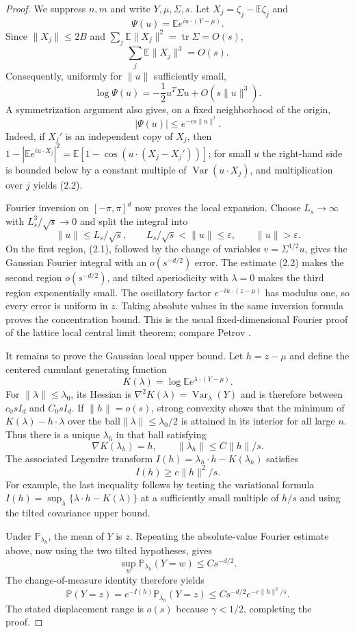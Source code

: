 \documentclass[11pt]{article}
\theoremstyle{remark}
\newcommand{\Pp}{\mathbb P}
\newcommand{\Ee}{\mathbb E}
\newcommand{\Var}{\operatorname{Var}}
\begin{document}
\begin{proof}
We suppress $n,m$ and write $Y,\mu,\Sigma,s$.  Let
$X_j=\zeta_j-\Ee\zeta_j$ and
\[
        \Psi(u)=\Ee e^{iu\cdot(Y-\mu)}.
\]
Since $\|X_j\|\le2B$ and
$\sum_j\Ee\|X_j\|^2=\operatorname{tr}\Sigma=O(s)$,
\[
        \sum_j\Ee\|X_j\|^3=O(s).
\]
Consequently, uniformly for $\|u\|$ sufficiently small,
\[
        \log\Psi(u)=-\frac12u^T\Sigma u+O(s\|u\|^3).
        \tag{2.1}
\]
A symmetrization argument also gives, on a fixed neighborhood of the origin,
\[
        |\Psi(u)|\le e^{-cs\|u\|^2}.
        \tag{2.2}
\]
Indeed, if $X_j'$ is an independent copy of $X_j$, then
$1-|\Ee e^{iu\cdot X_j}|^2=
\Ee[1-\cos(u\cdot(X_j-X_j'))]$; for small $u$ the right-hand side is
bounded below by a constant multiple of $\Var(u\cdot X_j)$, and multiplication
over $j$ yields (2.2).

Fourier inversion on $[-\pi,\pi]^d$ now proves the local expansion.  Choose
$L_s\to\infty$ with $L_s^3/\sqrt{s}\to0$ and split the integral into
\[
 \|u\|\le L_s/\sqrt{s},\qquad
 L_s/\sqrt{s}<\|u\|\le\varepsilon,
 \qquad \|u\|>\varepsilon.
\]
On the first region, (2.1), followed by the change of variables
$v=\Sigma^{1/2}u$, gives the Gaussian Fourier integral with an
$o(s^{-d/2})$ error.  The estimate (2.2) makes the second region
$o(s^{-d/2})$, and tilted aperiodicity with $\lambda=0$ makes the third
region exponentially small.  The oscillatory factor
$e^{-iu\cdot(z-\mu)}$ has modulus one, so every error is uniform in $z$.
Taking absolute values in the same inversion formula proves the concentration
bound.  This is the usual fixed-dimensional Fourier proof of the lattice local
central limit theorem; compare Petrov \cite[Chapter~VII]{Petrov1975}.

It remains to prove the Gaussian local upper bound.  Let
$h=z-\mu$ and define the centered cumulant generating function
\[
        K(\lambda)=\log\Ee e^{\lambda\cdot(Y-\mu)}.
\]
For $\|\lambda\|\le\lambda_0$, its Hessian is
$\nabla^2K(\lambda)=\Var_\lambda(Y)$ and is therefore between
$c_0sI_d$ and $C_0sI_d$.  If $\|h\|=o(s)$, strong convexity shows that the
minimum of $K(\lambda)-h\cdot\lambda$ over the ball$\|\lambda\|\le\lambda_0/2$ is attained in its interior for all large $n$.
Thus there is a unique $\lambda_h$ in that ball satisfying
\[
        \nabla K(\lambda_h)=h,
        \qquad \|\lambda_h\|\le C\|h\|/s.
\]
The associated Legendre transform
$I(h)=\lambda_h\cdot h-K(\lambda_h)$ satisfies
\[
        I(h)\ge c\|h\|^2/s.
\]
For example, the last inequality follows by testing the variational formula
$I(h)=\sup_\lambda\{\lambda\cdot h-K(\lambda)\}$ at a sufficiently small
multiple of $h/s$ and using the tilted covariance upper bound.

Under $\Pp_{\lambda_h}$, the mean of $Y$ is $z$.  Repeating the absolute-value
Fourier estimate above, now using the two tilted hypotheses, gives
\[
        \sup_w\Pp_{\lambda_h}(Y=w)\le Cs^{-d/2}.
\]
The change-of-measure identity therefore yields
\[
 \Pp(Y=z)=e^{-I(h)}\Pp_{\lambda_h}(Y=z)
 \le Cs^{-d/2}e^{-c\|h\|^2/s}.
\]
The stated displacement range is $o(s)$ because $\gamma<1/2$, completing the
proof.
\end{proof}
\end{document}
